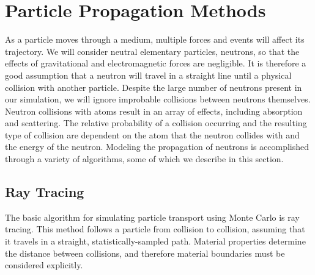 \section{Particle Propagation Methods}
\label{sec:propagation}

As a particle moves through a medium, multiple forces and events will
affect its trajectory. We will consider neutral elementary particles,
neutrons, so that the effects of gravitational and electromagnetic
forces are negligible. It is therefore a good assumption that a neutron
will travel in a straight line until a physical collision with another
particle. Despite the large number of neutrons present in our
simulation, we will ignore improbable collisions between neutrons
themselves. Neutron collisions with atoms result in an array of
effects, including absorption and scattering. The relative probability
of a collision occurring and the resulting type of collision are
dependent on the atom that the neutron collides with and the energy of the
neutron. Modeling the propagation of neutrons is accomplished through
a variety of algorithms, some of which we describe in this section.

\subsection{Ray Tracing}
\label{sec:ray_tracing}

The basic algorithm for simulating particle transport using Monte Carlo is
ray tracing. This method follows a particle from collision to
collision, assuming that it travels in a straight, statistically-sampled 
path. Material properties determine the distance between
collisions, and therefore material boundaries must be considered explicitly.

